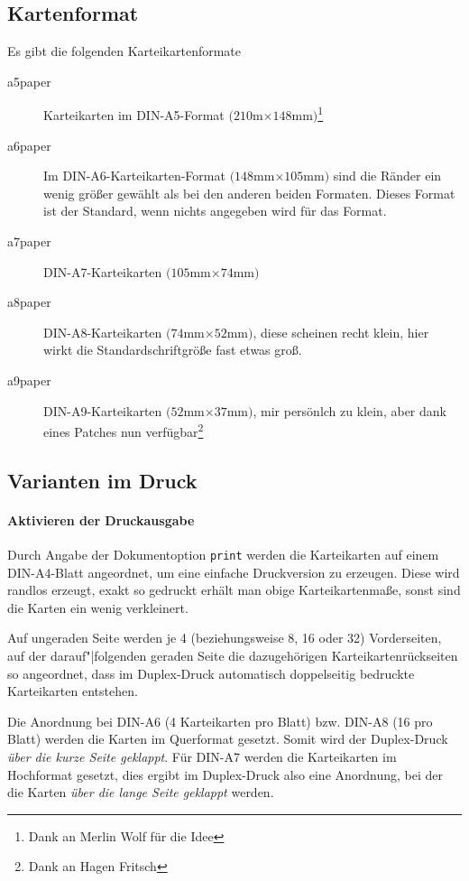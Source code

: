 \documentclass[a4paper,DIV=calc]{scrartcl}
\newcommand{\befehl}[1]{%
\marginpar{\footnotesize\textsf{#1}}%
}
\begin{document}
\subsection{Kartenformat}
\befehl{aXpaper}
Es gibt die folgenden Karteikartenformate
\begin{description}
	\item[a5paper] Karteikarten im DIN-A5-Format $(210$m$\times 148$mm$)$\footnote{Dank an Merlin Wolf für die Idee}
	\item[a6paper] Im DIN-A6-Karteikarten-Format $(148$mm$\times 105$mm$)$ sind die Ränder ein wenig größer gewählt als bei den anderen beiden Formaten. Dieses Format ist der Standard, wenn nichts angegeben wird für das Format.
	\item[a7paper] DIN-A7-Karteikarten $(105$mm$\times 74$mm$)$
	\item[a8paper] DIN-A8-Karteikarten $(74$mm$\times 52$mm$)$, diese scheinen recht klein, hier wirkt die Standardschriftgröße fast etwas groß.
	\item[a9paper] DIN-A9-Karteikarten $(52$mm$\times 37$mm$)$, mir persönlch zu klein, aber dank eines Patches nun verfügbar\footnote{Dank an Hagen Fritsch}
\end{description}
\subsection{Varianten im Druck}\befehl{print}
\paragraph{Aktivieren der Druckausgabe}
Durch Angabe der Dokumentoption \lstinline!print! werden die Karteikarten auf einem DIN-A4-Blatt angeordnet, um eine einfache Druckversion zu erzeugen. Diese wird randlos erzeugt, exakt so gedruckt erhält man obige Karteikartenmaße, sonst sind die Karten ein wenig verkleinert.

Auf ungeraden Seite werden je 4 (beziehungsweise 8, 16 oder 32) Vorderseiten, auf der darauf"|folgenden geraden Seite die dazugehörigen Karteikartenrückseiten so angeordnet, dass im Duplex-Druck automatisch doppelseitig bedruckte Karteikarten entstehen.

Die Anordnung bei DIN-A6 (4 Karteikarten pro Blatt) bzw. DIN-A8 (16 pro Blatt) werden die Karten im Querformat gesetzt. Somit wird der Duplex-Druck  \emph{über die kurze Seite geklappt}. Für DIN-A7 werden die Karteikarten im Hochformat gesetzt, dies ergibt im Duplex-Druck also eine Anordnung, bei der die Karten \emph{über die lange Seite geklappt} werden.
\end{document}
